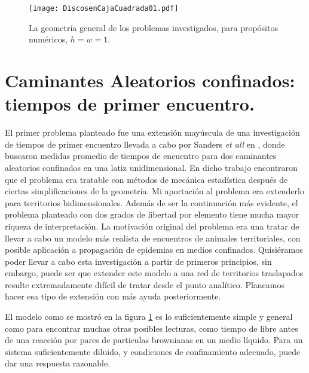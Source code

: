 \documentclass[letterpaper, 11pt]{article}
\begin{document}
\begin{figure}[h]
  \centering
 \texttt{[image: DiscosenCajaCuadrada01.pdf]}
 \caption{La geometría general de los problemas investigados, para propósitos
numéricos, $h=w=1$.}
 \label{PrimeraFigura}
\end{figure}

\section{Caminantes Aleatorios confinados: tiempos de primer encuentro.}

El primer problema planteado fue una extensión mayúscula
 de una investigación
de tiempos de primer encuentro llevada a cabo por 
Sanders \emph{et all} en \cite{SandersLuca}, donde buscaron medidas
promedio de tiempos de encuentro para dos
caminantes aleatorios confinados en una latiz unidimensional.
En dicho trabajo encontraron que el problema
era tratable con métodos de mecánica estadística después de ciertas
simplificaciones de la geometría. 
Mi aportación al problema
era extenderlo para territorios bidimensionales. 
Además de ser la continuación más evidente, el problema
planteado con dos grados de libertad por elemento tiene
mucha mayor riqueza de interpretación.
La motivación original del problema era una tratar de llevar a cabo
un modelo más realista de encuentros de animales territoriales, con posible
aplicación a propagación de epidemias en medios confinados. 
Quisiéramos poder llevar a cabo esta investigación a partir
de primeros principios, sin embargo, puede ser que extender
este modelo a una red de territorios traslapados 
resulte extremadamente difícil de tratar desde el punto
analítico. Planeamos hacer esa tipo de extensión con
más ayuda posteriormente.

El modelo como se mostró en la figura \ref{PrimeraFigura}
es lo suficientemente simple y general como para encontrar muchas 
otras posibles lecturas, como tiempo de libre antes
de una reacción por pares de 
particulas brownianas en un medio líquido. Para un sistema
suficientemente diluido, y condiciones de confinamiento
adecuado, puede dar una respuesta razonable.
\end{document}
